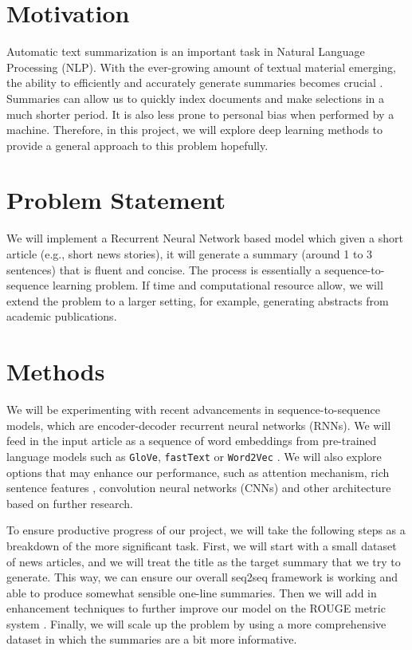 \section{Motivation}
Automatic text summarization is an important task in Natural Language Processing (NLP). With the ever-growing amount of textual material emerging, the ability to efficiently and accurately generate summaries becomes crucial \cite{gambhir2017recent}. Summaries can allow us to quickly index documents and make selections in a much shorter period. It is also less prone to personal bias when performed by a machine. Therefore, in this project, we will explore deep learning methods to provide a general approach to this problem hopefully.

\section{Problem Statement}
We will implement a Recurrent Neural Network based model which given a short article (e.g., short news stories), it will generate a summary (around 1 to 3 sentences) that is fluent and concise. The process is essentially a sequence-to-sequence learning problem. If time and computational resource allow, we will extend the problem to a larger setting, for example, generating abstracts from academic publications. 


\section{Methods}
We will be experimenting with recent advancements in sequence-to-sequence models, which are encoder-decoder recurrent neural networks (RNNs). We will feed in the input article as a sequence of word embeddings from pre-trained language models such as \texttt{GloVe}, \texttt{fastText} or \texttt{Word2Vec} \cite{pennington2014glove, bojanowski2017enriching, mikolov2013efficient}. We will also explore options that may enhance our performance, such as attention mechanism, rich sentence features \cite{nallapati2016abstractive}, convolution neural networks (CNNs) and other architecture based on further research.  

To ensure productive progress of our project, we will take the following steps as a breakdown of the more significant task. First, we will start with a small dataset of news articles, and we will treat the title as the target summary that we try to generate. This way, we can ensure our overall seq2seq framework is working and able to produce somewhat sensible one-line summaries. Then we will add in enhancement techniques to further improve our model on the ROUGE metric system \cite{lin2004rouge}. Finally, we will scale up the problem by using a more comprehensive dataset in which the summaries are a bit more informative. 

